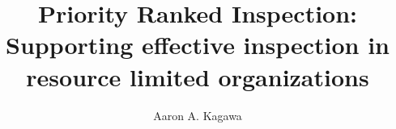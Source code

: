 \documentclass[11pt,final,times,thesis,actual]{uhthesis2e}
\begin{document}
\title{Priority Ranked Inspection: \\ Supporting effective inspection in
  resource limited organizations}
\author{Aaron A. Kagawa}

\maketitle

\begin{frontmatter}
\signaturepage 
\copyrightpage



\tableofcontents
\listoftables
\listoffigures
\end{frontmatter}











%

\end{document}

